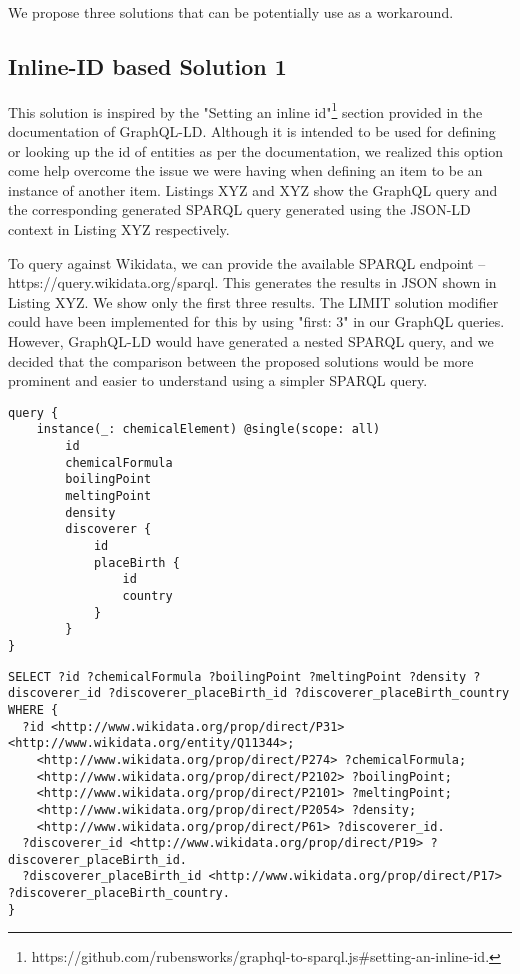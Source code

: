 We propose three solutions that can be potentially use as a workaround. 

\subsection{Inline-ID based Solution 1}

This solution is inspired by the "Setting an inline id"\footnote{https://github.com/rubensworks/graphql-to-sparql.js\#setting-an-inline-id.} section provided in the documentation of GraphQL-LD. Although it is intended to be used for defining or looking up the id of entities as per the documentation, we realized this option come help overcome the issue we were having when defining an item to be an instance of another item. Listings XYZ and XYZ show the GraphQL query and the corresponding generated SPARQL query generated using the JSON-LD context in Listing XYZ respectively. 

To query against Wikidata, we can provide the available SPARQL endpoint – https://query.wikidata.org/sparql. This generates the results in JSON shown in Listing XYZ. We show only the first three results. The LIMIT solution modifier could have been implemented for this by using "first: 3" in our GraphQL queries. However, GraphQL-LD would have generated a nested SPARQL query, and we decided that the comparison between the proposed solutions would be more prominent and easier to understand using a simpler SPARQL query.

\begin{minipage}{\linewidth}
\begin{lstlisting}[label=listing:listing20, caption={Query}]
query {
    instance(_: chemicalElement) @single(scope: all)
        id
        chemicalFormula
        boilingPoint
        meltingPoint
        density
        discoverer {
            id
            placeBirth {
                id
                country
            }
        }
}
\end{lstlisting}
\end{minipage}

\begin{minipage}{\linewidth}
\begin{lstlisting}[label=listing:listing21, caption={Generated SPARQL Query}]
SELECT ?id ?chemicalFormula ?boilingPoint ?meltingPoint ?density ?discoverer_id ?discoverer_placeBirth_id ?discoverer_placeBirth_country WHERE {
  ?id <http://www.wikidata.org/prop/direct/P31> <http://www.wikidata.org/entity/Q11344>;
    <http://www.wikidata.org/prop/direct/P274> ?chemicalFormula;
    <http://www.wikidata.org/prop/direct/P2102> ?boilingPoint;
    <http://www.wikidata.org/prop/direct/P2101> ?meltingPoint;
    <http://www.wikidata.org/prop/direct/P2054> ?density;
    <http://www.wikidata.org/prop/direct/P61> ?discoverer_id.
  ?discoverer_id <http://www.wikidata.org/prop/direct/P19> ?discoverer_placeBirth_id.
  ?discoverer_placeBirth_id <http://www.wikidata.org/prop/direct/P17> ?discoverer_placeBirth_country.
}
\end{lstlisting}
\end{minipage}

